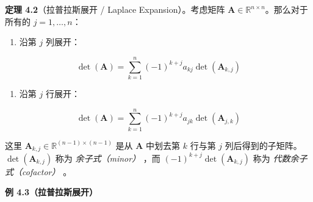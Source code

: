 \textbf{定理 4.2}（拉普拉斯展开 / Laplace Expansion）。考虑矩阵 $ \boldsymbol{A} \in \mathbb{R}^{n \times n} $。那么对于所有的 $ j = 1, \ldots, n $：

\begin{enumerate}
\item 沿第 $ j $ 列展开：
\end{enumerate}

\begin{equation}
\det(\boldsymbol{A}) = \sum_{k=1}^n (-1)^{k+j} a_{kj} \det(\boldsymbol{A}_{k,j})
\tag{4.12}\label{eq:4-12}
\end{equation}

\begin{enumerate}
\item 沿第 $ j $ 行展开：
\end{enumerate}

\begin{equation}
\det(\boldsymbol{A}) = \sum_{k=1}^n (-1)^{k+j} a_{jk} \det(\boldsymbol{A}_{j,k})
\tag{4.13}\label{eq:4-13}
\end{equation}

这里 $ \boldsymbol{A}_{k,j} \in \mathbb{R}^{(n-1) \times (n-1)} $ 是从 $ \boldsymbol{A} $ 中划去第 $ k $ 行与第 $ j $ 列后得到的子矩阵。$ \det(\boldsymbol{A}_{k,j}) $ 称为 \emph{余子式（minor）} ，而 $ (-1)^{k+j}\det(\boldsymbol{A}_{k,j}) $ 称为 \emph{代数余子式（cofactor）} 。

\begin{notebox}
\textbf{例 4.3（拉普拉斯展开）}
\end{notebox}

